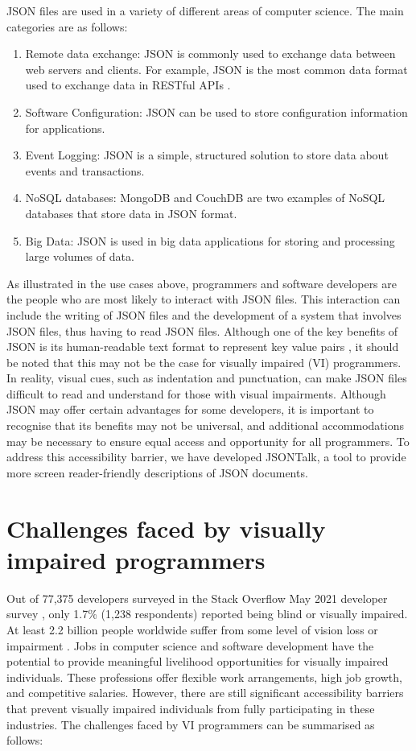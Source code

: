 \documentclass{l4proj}
\begin{document}
JSON files are used in a variety of different areas of computer science. The main categories are as follows: 
\begin{enumerate}
    \item Remote data exchange: JSON is commonly used to exchange data between web servers and clients. For example, JSON is the most common data format used to exchange data in RESTful APIs \cite{Barbaglia_Murzilli_Cudini_2017}.
    \item Software Configuration: JSON can be used to store configuration information for applications.
    \item Event Logging: JSON is a simple, structured solution to store data about events and transactions.
    \item NoSQL databases: MongoDB and CouchDB are two examples of NoSQL databases that store data in JSON format.
    \item Big Data: JSON is used in big data applications for storing and processing large volumes of data. 
\end{enumerate}

As illustrated in the use cases above, programmers and software developers are the people who are most likely to interact with JSON files. This interaction can include the writing of JSON files and the development of a system that involves JSON files, thus having to read JSON files. Although one of the key benefits of JSON is its human-readable text format to represent key value pairs \cite{friesen2019introducing, nurseitov2009comparison, JSON}, it should be noted that this may not be the case for visually impaired (VI) programmers. In reality, visual cues, such as indentation and punctuation, can make JSON files difficult to read and understand for those with visual impairments. Although JSON may offer certain advantages for some developers, it is important to recognise that its benefits may not be universal, and additional accommodations may be necessary to ensure equal access and opportunity for all programmers. To address this accessibility barrier, we have developed JSONTalk, a tool to provide more screen reader-friendly descriptions of JSON documents. 

\section{Challenges faced by visually impaired programmers}

Out of 77,375 developers surveyed in the Stack Overflow May 2021 developer survey \cite{stack22}, only 1.7\% (1,238 respondents) reported being blind or visually impaired. At least 2.2 billion people worldwide suffer from some level of vision loss or impairment \cite{World}. Jobs in computer science and software development have the potential to provide meaningful livelihood opportunities for visually impaired individuals. These professions offer flexible work arrangements, high job growth, and competitive salaries. However, there are still significant accessibility barriers that prevent visually impaired individuals from fully participating in these industries. The challenges faced by VI programmers can be summarised as follows:
\end{document}
